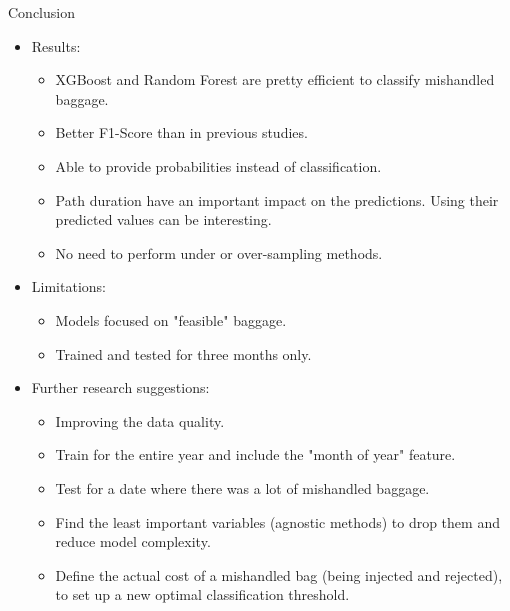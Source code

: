 \documentclass{beamer}
\begin{document}
\begin{frame}{Conclusion} 
    \begin{itemize}
        \item Results:
            \begin{itemize}
                \item XGBoost and Random Forest are pretty efficient to classify mishandled baggage.
                \item Better F1-Score than in previous studies.
                \item Able to provide probabilities instead of classification.
                \item Path duration have an important impact on the predictions. Using their predicted values can be interesting.
                \item No need to perform under or over-sampling methods.
            \end{itemize}
        \item Limitations:
            \begin{itemize}
                \item Models focused on "feasible" baggage.
                \item Trained and tested for three months only.
            \end{itemize}
        \item Further research suggestions:
            \begin{itemize}
                \item Improving the data quality.
                \item Train for the entire year and include the "month of year" feature.
                \item Test for a date where there was a lot of mishandled baggage.
                \item Find the least important variables (agnostic methods) to drop them and reduce model complexity.
                \item Define the actual cost of a mishandled bag (being injected and rejected), to set up a new optimal classification threshold.
            \end{itemize}
    \end{itemize}
\end{frame}
\end{document}
